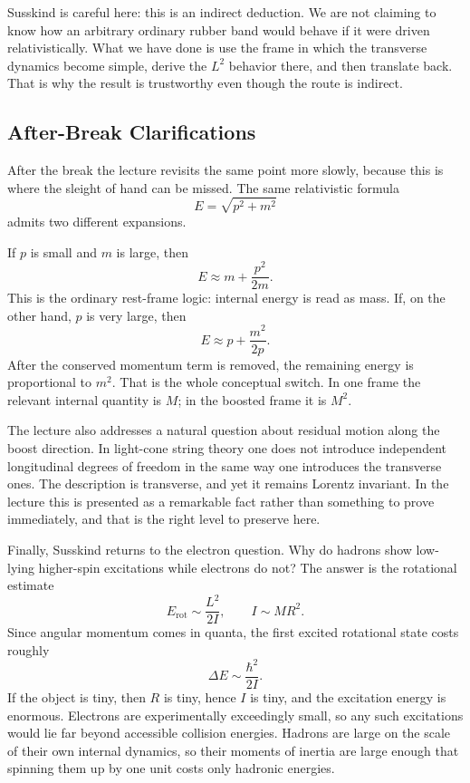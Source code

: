 Susskind is careful here: this is an indirect deduction. We are not claiming to know how an arbitrary ordinary rubber band would behave if it were driven relativistically. What we have done is use the frame in which the transverse dynamics become simple, derive the \(L^2\) behavior there, and then translate back. That is why the result is trustworthy even though the route is indirect.

\subsection{After-Break Clarifications}

After the break the lecture revisits the same point more slowly, because this is where the sleight of hand can be missed. The same relativistic formula
\begin{equation}
E=\sqrt{p^2+m^2}
\end{equation}
admits two different expansions.

If \(p\) is small and \(m\) is large, then
\begin{equation}
E \approx m+\frac{p^2}{2m}.
\end{equation}
This is the ordinary rest-frame logic: internal energy is read as mass. If, on the other hand, \(p\) is very large, then
\begin{equation}
E \approx p+\frac{m^2}{2p}.
\end{equation}
After the conserved momentum term is removed, the remaining energy is proportional to \(m^2\). That is the whole conceptual switch. In one frame the relevant internal quantity is \(M\); in the boosted frame it is \(M^2\).

The lecture also addresses a natural question about residual motion along the boost direction. In light-cone string theory one does not introduce independent longitudinal degrees of freedom in the same way one introduces the transverse ones. The description is transverse, and yet it remains Lorentz invariant. In the lecture this is presented as a remarkable fact rather than something to prove immediately, and that is the right level to preserve here.

Finally, Susskind returns to the electron question. Why do hadrons show low-lying higher-spin excitations while electrons do not? The answer is the rotational estimate
\begin{equation}
E_{\mathrm{rot}} \sim \frac{L^2}{2I},
\qquad
I \sim M R^2.
\end{equation}
Since angular momentum comes in quanta, the first excited rotational state costs roughly
\begin{equation}
\Delta E \sim \frac{\hbar^2}{2I}.
\end{equation}
If the object is tiny, then \(R\) is tiny, hence \(I\) is tiny, and the excitation energy is enormous. Electrons are experimentally exceedingly small, so any such excitations would lie far beyond accessible collision energies. Hadrons are large on the scale of their own internal dynamics, so their moments of inertia are large enough that spinning them up by one unit costs only hadronic energies.

